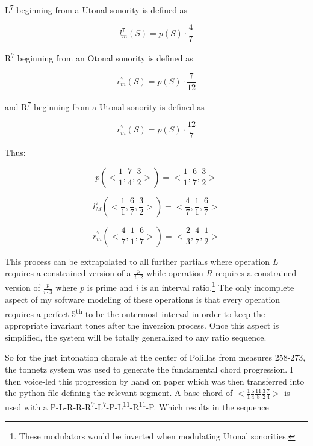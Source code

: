 L\textsuperscript{7} beginning from a Utonal sonority is defined as

\begin{equation}
    l^{7}_{m}(S)=p(S)\cdot\frac{4}{7}
\end{equation}

R\textsuperscript{7} beginning from an Otonal sonority is defined as

\begin{equation}
    r^{7}_{m}(S)=p(S)\cdot\frac{7}{12}
\end{equation}

and R\textsuperscript{7} beginning from a Utonal sonority is defined as

\begin{equation}
    r^{7}_{m}(S)=p(S)\cdot\frac{12}{7}
\end{equation}

Thus:

\begin{equation}
    p(<\frac{1}{1},\frac{7}{4},\frac{3}{2}>)=<\frac{1}{1},\frac{6}{7},\frac{3}{2}>
\end{equation}

\begin{equation}
    l^{7}_{M}(<\frac{1}{1},\frac{6}{7},\frac{3}{2}>)=<\frac{4}{7},\frac{1}{1},\frac{6}{7}>
\end{equation}

\begin{equation}
    r^{7}_{m}(<\frac{4}{7},\frac{1}{1},\frac{6}{7}>)=<\frac{2}{3},\frac{4}{7},\frac{1}{2}>
\end{equation}

This process can be extrapolated to all further partials where operation $L$ requires a constrained version of a $\frac{p}{i \cdot 2}$ while operation $R$ requires a constrained version of $\frac{p}{i \cdot 3}$ where $p$ is prime and $i$ is an interval ratio.\footnote{These modulators would be inverted when modulating Utonal sonorities.} The only incomplete aspect of my software modeling of these operations is that every operation requires a perfect 5\textsuperscript{th} to be the outermost interval in order to keep the appropriate invariant tones after the inversion process. Once this aspect is simplified, the system will be totally generalized to any ratio sequence.

So for the just intonation chorale at the center of Polillas from measures 258-273, the tonnetz system was used to generate the fundamental chord progression. I then voice-led this progression by hand on paper which was then transferred into the python file defining the relevant segment. A base chord of $<\frac{1}{1} \frac{5}{4} \frac{11}{8} \frac{3}{2} \frac{7}{4}>$ is used with a P-L-R-R-R\textsuperscript{7}-L\textsuperscript{7}-P-L\textsuperscript{11}-R\textsuperscript{11}-P. Which results in the sequence

